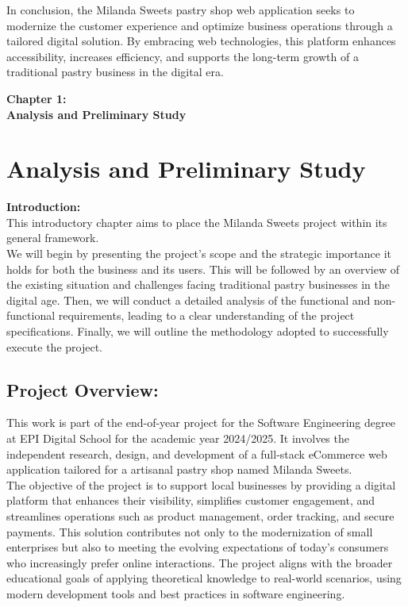 In conclusion, the Milanda Sweets pastry shop web application seeks to modernize the
customer experience and optimize business operations through a tailored digital solution. By
embracing web technologies, this platform enhances accessibility, increases efficiency, and
supports the long-term growth of a traditional pastry business in the digital era.


\newpage
\thispagestyle{empty} %
\vspace*{\fill}
\begin{center}
    {\Huge \textbf{Chapter 1:}}\\[0.8cm]
    {\Huge \textbf{Analysis and Preliminary Study}}
\end{center}
\vspace*{\fill}


\chapter{Analysis and Preliminary Study}
{\Large \textbf{Introduction:}}\\

This introductory chapter aims to place the Milanda Sweets project within its general framework.\\

We will begin by presenting the project’s scope and the strategic importance it holds for both the business and its users. This will be followed by an overview of the existing situation and challenges facing traditional pastry businesses in the digital age. Then, we will conduct a detailed analysis of the functional and non-functional requirements, leading to a clear understanding of the project specifications. Finally, we will outline the methodology adopted to successfully execute the project.

\section{Project Overview:}

This work is part of the end-of-year project for the Software Engineering degree at
EPI Digital School for the academic year 2024/2025. It involves the independent research,
design, and development of a full-stack eCommerce web application tailored for a artisanal
pastry shop named Milanda Sweets.\\

The objective of the project is to support local businesses by providing a digital
platform that enhances their visibility, simplifies customer engagement, and streamlines
operations such as product management, order tracking, and secure payments. This solution
contributes not only to the modernization of small enterprises but also to meeting the
evolving expectations of today’s consumers who increasingly prefer online interactions.
The project aligns with the broader educational goals of applying theoretical knowledge to
real-world scenarios, using modern development tools and best practices in software
engineering.

